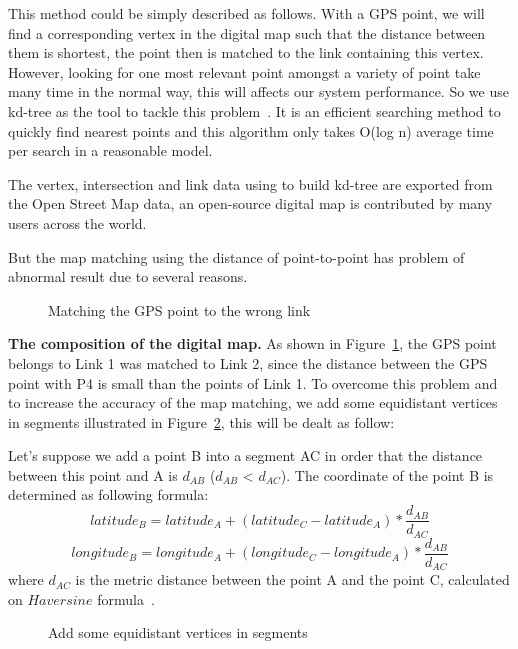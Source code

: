 \documentclass{acm_proc_article-sp}
\begin{document}
This method could be simply described as follows. With a GPS point, we will find a corresponding vertex in the digital map such that the distance between them is shortest, the point then is matched to the link containing this vertex. However, looking for one most relevant point amongst a variety of point take many time in the normal way, this will affects our system performance. So we use kd-tree as the tool to tackle this problem~\cite{moh2013approximate}. It is an efficient searching method to quickly find nearest points and this algorithm only takes O(log n) average time per search in a reasonable model. 

The vertex, intersection and link data using to build kd-tree are exported from the Open Street Map data, an open-source digital map is contributed by many users across the world. 

But the map matching using the distance of point-to-point has problem of abnormal result due to several reasons.

\begin{figure}[h]
\centering
{}
\caption{Matching the GPS point to the wrong link}
\label{fig:abnormalresult}
\end{figure}

\textbf{The composition of the digital map.} As shown in Figure~\ref{fig:abnormalresult}, the GPS point belongs to Link 1 was matched to Link 2, since the distance between the GPS point with P4 is small than the points of Link 1. To overcome this problem and to increase the accuracy of the map matching, we add some equidistant vertices in segments illustrated in Figure~\ref{fig:addPointsToRoad}, this will be dealt as follow: 

Let's suppose we add a point B into a segment AC in order that the distance between this point and A is $d_{AB}$ ($d_{AB}$ < $d_{AC}$). The coordinate of the point B is determined as following formula:
\[ latitude_{B} = latitude_{A} + (latitude_{C} - latitude_{A}) \ast \frac{d_{AB}}{d_{AC}}\]
\[ longitude_{B} = longitude_{A} + (longitude_{C} - longitude_{A}) \ast \frac{d_{AB}}{d_{AC}}\]
where $d_{AC}$ is the metric distance between the point A and the point C, calculated on $Haversine$ formula~\cite{haversineweb}.
	
\begin{figure}[h]
\centering
{}
\caption{Add some equidistant vertices in segments}
\label{fig:addPointsToRoad}
\end{figure}
\end{document}
